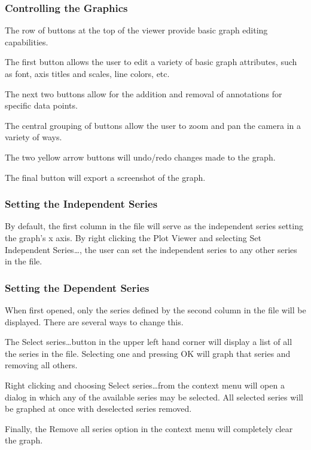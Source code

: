 \subsubsection{Controlling the Graphics}

The row of buttons at the top of the viewer provide basic graph editing
capabilities.

The first button allows the user to edit a variety of basic graph attributes,
such as font, axis titles and scales, line colors, etc.

The next two buttons allow for the addition and removal of annotations for
specific data points. 

The central grouping of buttons allow the user to zoom and pan the camera in a
variety of ways. 

The two yellow arrow buttons will undo/redo changes made to the graph.

The final button will export a screenshot of the graph.

\subsubsection{Setting the Independent Series}

By default, the first column in the file will serve as the independent series
setting the graph's x axis. By right clicking the Plot Viewer and selecting Set
Independent Series\ldots, the user can set the independent series to any other
series in the file.

\subsubsection{Setting the Dependent Series}

When first opened, only the series defined by the second column in the file will
be displayed. There are several ways to change this. 

The Select series\ldots button in the upper left hand corner will display a list
of all the series in the file. Selecting one and pressing OK will graph that
series and removing all others.

Right clicking and choosing Select series\ldots from the context menu will open
a dialog in which any of the available series may be selected. All selected
series will be graphed at once with deselected series removed.

Finally, the Remove all series option in the context menu will completely clear
the graph.

